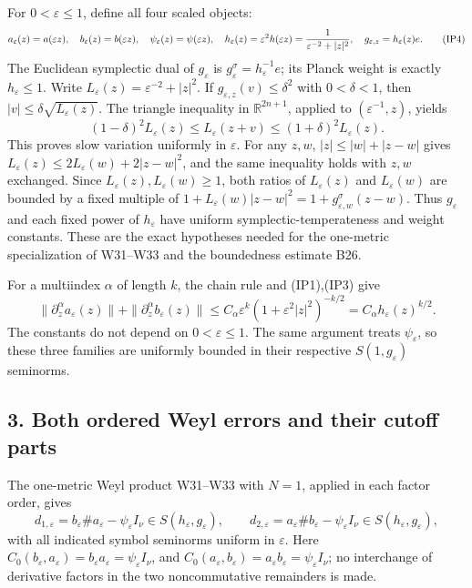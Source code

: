 \documentclass[
  11pt,
]{article}
\begin{document}
For \(0<\varepsilon\le1\), define all four scaled objects: \[
 a_\varepsilon(z)=a(\varepsilon z),\quad
 b_\varepsilon(z)=b(\varepsilon z),\quad
 \psi_\varepsilon(z)=\psi(\varepsilon z),\quad
 h_\varepsilon(z)=\varepsilon^2h(\varepsilon z)
   ={1\over\varepsilon^{-2}+|z|^2},\quad
 g_{\varepsilon,z}=h_\varepsilon(z)e .
 \tag{IP4}
\] The Euclidean symplectic dual of \(g_\varepsilon\) is
\(g_\varepsilon^\sigma=h_\varepsilon^{-1}e\); its Planck weight is
exactly \(h_\varepsilon\le1\). Write
\(L_\varepsilon(z)=\varepsilon^{-2}+|z|^2\). If
\(g_{\varepsilon,z}(v)\le\delta^2\) with \(0<\delta<1\), then
\(|v|\le\delta\sqrt{L_\varepsilon(z)}\). The triangle inequality in
\(\mathbb R^{2n+1}\), applied to \((\varepsilon^{-1},z)\), yields \[
 (1-\delta)^2L_\varepsilon(z)
 \le L_\varepsilon(z+v)
 \le(1+\delta)^2L_\varepsilon(z).
 \tag{IP5}
\] This proves slow variation uniformly in \(\varepsilon\). For any
\(z,w\), \(|z|\le|w|+|z-w|\) gives
\(L_\varepsilon(z)\le2L_\varepsilon(w)+2|z-w|^2\), and the same
inequality holds with \(z,w\) exchanged. Since
\(L_\varepsilon(z),L_\varepsilon(w)\ge1\), both ratios of
\(L_\varepsilon(z)\) and \(L_\varepsilon(w)\) are bounded by a fixed
multiple of
\(1+L_\varepsilon(w)|z-w|^2=1+g_{\varepsilon,w}^\sigma(z-w)\). Thus
\(g_\varepsilon\) and each fixed power of \(h_\varepsilon\) have uniform
symplectic-temperateness and weight constants. These are the exact
hypotheses needed for the one-metric specialization of W31--W33 and the
boundedness estimate B26.

For a multiindex \(\alpha\) of length \(k\), the chain rule and
(IP1),(IP3) give \[
 \|\partial_z^\alpha a_\varepsilon(z)\|
 +\|\partial_z^\alpha b_\varepsilon(z)\|
 \le C_\alpha\varepsilon^k(1+\varepsilon^2|z|^2)^{-k/2}
 =C_\alpha h_\varepsilon(z)^{k/2}.
 \tag{IP6}
\] The constants do not depend on \(0<\varepsilon\le1\). The same
argument treats \(\psi_\varepsilon\), so these three families are
uniformly bounded in their respective \(S(1,g_\varepsilon)\) seminorms.

\subsection{3. Both ordered Weyl errors and their cutoff
parts}\label{both-ordered-weyl-errors-and-their-cutoff-parts}

The one-metric Weyl product W31--W33 with \(N=1\), applied in each
factor order, gives \[
 d_{1,\varepsilon}
   =b_\varepsilon\#a_\varepsilon-\psi_\varepsilon I_\nu
       \in S(h_\varepsilon,g_\varepsilon),\qquad
 d_{2,\varepsilon}
   =a_\varepsilon\#b_\varepsilon-\psi_\varepsilon I_\nu
       \in S(h_\varepsilon,g_\varepsilon),
 \tag{IP7}
\] with all indicated symbol seminorms uniform in \(\varepsilon\). Here
\(C_0(b_\varepsilon,a_\varepsilon)=b_\varepsilon a_\varepsilon=\psi_\varepsilon I_\nu\),
and
\(C_0(a_\varepsilon,b_\varepsilon)=a_\varepsilon b_\varepsilon=\psi_\varepsilon I_\nu\);
no interchange of derivative factors in the two noncommutative
remainders is made.
\end{document}
